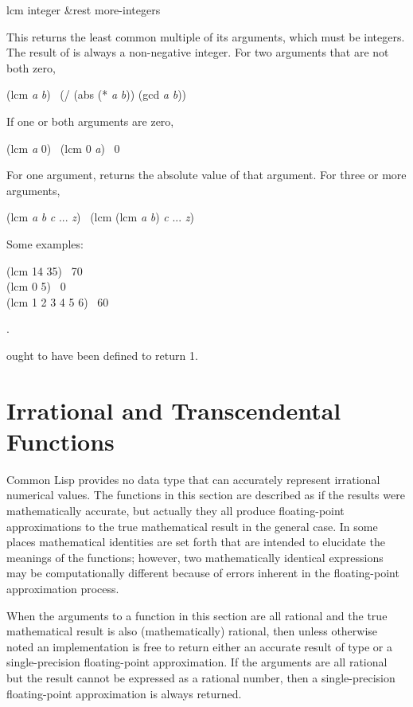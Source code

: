 \begin{defun}[Function]
lcm integer &rest more-integers

This returns the least common multiple of its arguments,
which must be integers.
The result of  is always a non-negative integer.
For two arguments that are not both zero,
\begin{lisp}
(lcm \emph{a} \emph{b}) \EQ\ (/ (abs (* \emph{a} \emph{b})) (gcd \emph{a} \emph{b}))
\end{lisp}
If one or both arguments are zero,
\begin{lisp}
(lcm \emph{a} 0) \EQ\ (lcm 0 \emph{a}) \EQ\ 0
\end{lisp}

For one argument,  returns the absolute value of that argument.
For three or more arguments,
\begin{lisp}
(lcm \emph{a} \emph{b} \emph{c} ... \emph{z}) \EQ\ (lcm (lcm \emph{a} \emph{b}) \emph{c} ... \emph{z})
\end{lisp}

Some examples:
\begin{lisp}
(lcm 14 35) \EV\ 70 \\
(lcm 0 5) \EV\ 0 \\
(lcm 1 2 3 4 5 6) \EV\ 60
\end{lisp}

\begin{lisp}
.  
\end{lisp}

 ought to have been defined to return 1.
\end{defun}

\section{Irrational and Transcendental Functions}
\label{TRANSCENDENTAL-SECTION}

Common Lisp provides no data type that can accurately represent irrational
numerical values.
The functions in this section are described as if the results
were mathematically accurate, but actually they all produce floating-point
approximations to the true mathematical result in the general case.
In some places
mathematical identities are set forth that are intended to elucidate the
meanings of the functions; however, two mathematically identical
expressions may be computationally different because of errors
inherent in the floating-point approximation process.

When the arguments to
a function in this section are all rational and the true mathematical result
is also (mathematically) rational, then unless otherwise noted
an implementation is free to return either an accurate result of
type  or a single-precision floating-point approximation.
If the arguments are all rational but the result cannot be expressed
as a rational number, then a single-precision floating-point
approximation is always returned.

